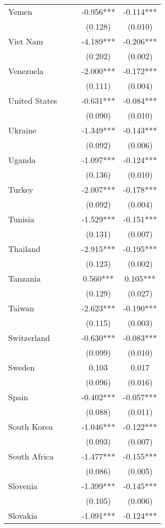 \documentclass[]{article}
\begin{document}
\begin{tabular}{lcccc}
Yemen &  &  & -0.956*** & -0.114*** \\
 &  &  & (0.128) & (0.010) \\
Viet Nam &  &  & -4.189*** & -0.206*** \\
 &  &  & (0.202) & (0.002) \\
Venezuela &  &  & -2.000*** & -0.172*** \\
 &  &  & (0.111) & (0.004) \\
United States &  &  & -0.631*** & -0.084*** \\
 &  &  & (0.090) & (0.010) \\
Ukraine &  &  & -1.349*** & -0.143*** \\
 &  &  & (0.092) & (0.006) \\
Uganda &  &  & -1.097*** & -0.124*** \\
 &  &  & (0.136) & (0.010) \\
Turkey &  &  & -2.007*** & -0.178*** \\
 &  &  & (0.092) & (0.004) \\
Tunisia &  &  & -1.529*** & -0.151*** \\
 &  &  & (0.131) & (0.007) \\
Thailand &  &  & -2.915*** & -0.195*** \\
 &  &  & (0.123) & (0.002) \\
Tanzania &  &  & 0.560*** & 0.105*** \\
 &  &  & (0.129) & (0.027) \\
Taiwan &  &  & -2.623*** & -0.190*** \\
 &  &  & (0.115) & (0.003) \\
Switzerland &  &  & -0.630*** & -0.083*** \\
 &  &  & (0.099) & (0.010) \\
Sweden &  &  & 0.103 & 0.017 \\
 &  &  & (0.096) & (0.016) \\
Spain &  &  & -0.402*** & -0.057*** \\
 &  &  & (0.088) & (0.011) \\
South Korea &  &  & -1.046*** & -0.122*** \\
 &  &  & (0.093) & (0.007) \\
South Africa &  &  & -1.477*** & -0.155*** \\
 &  &  & (0.086) & (0.005) \\
Slovenia &  &  & -1.399*** & -0.145*** \\
 &  &  & (0.105) & (0.006) \\
Slovakia &  &  & -1.091*** & -0.124*** \\

\end{tabular}
\end{document}
